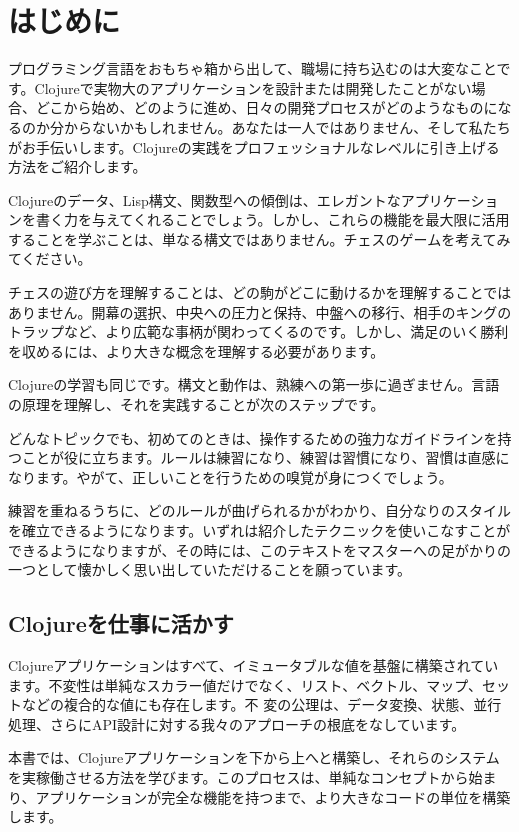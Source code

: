 \section{はじめに}

プログラミング言語をおもちゃ箱から出して、職場に持ち込むのは大変なことです。Clojureで実物大のアプリケーションを設計または開発したことがない場合、どこから始め、どのように進め、日々の開発プロセスがどのようなものになるのか分からないかもしれません。あなたは一人ではありません、そして私たちがお手伝いします。Clojureの実践をプロフェッショナルなレベルに引き上げる方法をご紹介します。

Clojureのデータ、Lisp構文、関数型への傾倒は、エレガントなアプリケーションを書く力を与えてくれることでしょう。しかし、これらの機能を最大限に活用することを学ぶことは、単なる構文ではありません。チェスのゲームを考えてみてください。

チェスの遊び方を理解することは、どの駒がどこに動けるかを理解することではありません。開幕の選択、中央への圧力と保持、中盤への移行、相手のキングのトラップなど、より広範な事柄が関わってくるのです。しかし、満足のいく勝利を収めるには、より大きな概念を理解する必要があります。

Clojureの学習も同じです。構文と動作は、熟練への第一歩に過ぎません。言語の原理を理解し、それを実践することが次のステップです。

どんなトピックでも、初めてのときは、操作するための強力なガイドラインを持つことが役に立ちます。ルールは練習になり、練習は習慣になり、習慣は直感になります。やがて、正しいことを行うための嗅覚が身につくでしょう。

練習を重ねるうちに、どのルールが曲げられるかがわかり、自分なりのスタイルを確立できるようになります。いずれは紹介したテクニックを使いこなすことができるようになりますが、その時には、このテキストをマスターへの足がかりの一つとして懐かしく思い出していただけることを願っています。


\subsection{Clojureを仕事に活かす}

Clojureアプリケーションはすべて、イミュータブルな値を基盤に構築されています。不変性は単純なスカラー値だけでなく、リスト、ベクトル、マップ、セットなどの複合的な値にも存在します。不 変の公理は、データ変換、状態、並行処理、さらにAPI設計に対する我々のアプローチの根底をなしています。

本書では、Clojureアプリケーションを下から上へと構築し、それらのシステムを実稼働させる方法を学びます。このプロセスは、単純なコンセプトから始まり、アプリケーションが完全な機能を持つまで、より大きなコードの単位を構築します。

